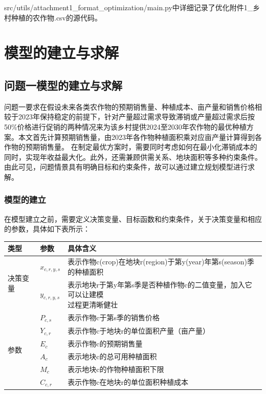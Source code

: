 \documentclass{cumcmthesis}
\begin{document}
src/utils/attachment1\_format\_optimization/main.py中详细记录了优化附件1\_乡村种植的农作物.csv的源代码。


\section{模型的建立与求解}
\subsection{问题一模型的建立与求解}
问题一要求在假设未来各类农作物的预期销售量、种植成本、亩产量和销售价格相较于2023年保持稳定的前提下，针对产量超过需求导致滞销或产量超过需求后按50\%价格进行促销的两种情况来为该乡村提供2024至2030年农作物的最优种植方案。本文首先计算预期销售量，由2023年各作物种植面积乘对应亩产量计算得到各作物的预期销售量。
在制定最优方案时，需要同时考虑如何在最小化滞销成本的同时，实现年收益最大化。此外，还需兼顾供需关系、地块面积等多种约束条件。由此可见，问题情景具有明确目标和约束条件，故可以通过建立规划模型进行求解。



\subsubsection{模型的建立}
在模型建立之前，需要定义决策变量、目标函数和约束条件，关于决策变量和相应的参数，具体如下表所示：
\begin{table}[H]
    \centering
    \begin{tabular}{|l|l|l|}
        \hline
        类型 & 参数 & 具体含义 \\ \hline
        \multirow{2}{*}{决策变量} & $x_{c,r,y,s}$ & 表示作物c(crop)在地块r(region)于第y(year)年第s(season)季的种植面积 \\ \cline{2-3}
        ~ & $y_{c,r,y,s}$ & \makecell{表示地块r于第y年第s季是否种植作物c的二值变量，加入它可以让建模\\过程更清晰健壮} \\ \hline
        \multirow{6}{*}{\centering 参数} & $P_{c,s}$ & 表示作物c于第s季的销售价格 \\ \cline{2-3}
        ~ & $Y_{c,r}$ & 表示作物c于地块r的单位面积产量（亩产量） \\ \cline{2-3}
        ~ & $E_{c}$ & 表示作物c的预期销售量 \\ \cline{2-3}
        ~ & $A_c$ & 表示地块c的总可用种植面积 \\ \cline{2-3}
        ~ & $M_c$ & 表示地块c的作物种植面积下限 \\ \cline{2-3}
        ~ & $C_{c,r}$ & 表示作物c在地块r的单位面积种植成本 \\ \hline
    \end{tabular}
\end{table}
\end{document}
